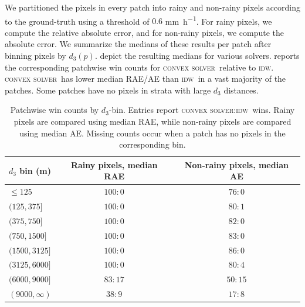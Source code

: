 \documentclass[a4paper,fleqn]{cas-sc}
\DeclareRobustCommand{\IDW}{\textsc{idw}}
\DeclareRobustCommand{\solverConvex}{\textsc{convex solver}}
\DeclareRobustCommand{\ConvexSolver}{\solverConvex}
\begin{document}
We partitioned the pixels in every patch into rainy and non-rainy pixels according to the ground-truth using a threshold of $0.6$ \si{\milli\meter\per\hour}. For rainy pixels, we compute the relative absolute error, and for non-rainy pixels, we compute the absolute error. We summarize the medians of these results per patch after binning pixels by $d_3(p)$.
 depict the resulting medians for various solvers.
 reports the corresponding patchwise win counts for \ConvexSolver\ relative to \IDW. \ConvexSolver\ has lower median RAE/AE than \IDW\ in a vast majority of the patches.  Some patches have no pixels in strata with large $d_3$ distances.

\begin{table}[!t]
  \centering
  \begin{tabular}{lcc}
    \toprule
    $d_3$ bin (m)   & Rainy pixels, median RAE & Non-rainy pixels, median AE \\
    \midrule
    $\leq 125$      & $100:0$                  & $76:0$                      \\
    $(125,375]$     & $100:0$                  & $80:1$                      \\
    $(375,750]$     & $100:0$                  & $82:0$                      \\
    $(750,1500]$    & $100:0$                  & $83:0$                      \\
    $(1500,3125]$   & $100:0$                  & $86:0$                      \\
    $(3125,6000]$   & $100:0$                  & $80:4$                      \\
    $(6000,9000]$   & $83:17$                  & $50:15$                     \\
    $(9000,\infty)$ & $38:9$                   & $17:8$                      \\
    \bottomrule
  \end{tabular}
  \caption{Patchwise win counts by $d_3$-bin. Entries report \ConvexSolver:\IDW\ wins. Rainy pixels are compared using median RAE, while non-rainy pixels are compared using median AE. Missing counts occur when a patch has no pixels in the corresponding bin.}
  \label{tab:distance-bin-win-counts}
\end{table}
\end{document}

